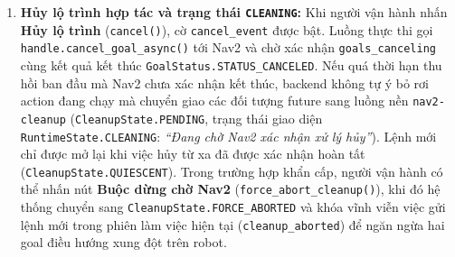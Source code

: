 \begin{enumerate}[leftmargin=1.2cm]
  \item \textbf{Hủy lộ trình hợp tác và trạng thái \texttt{CLEANING}:} Khi người vận hành nhấn \textbf{Hủy lộ trình} (\texttt{cancel()}), cờ \texttt{cancel\_event} được bật. Luồng thực thi gọi \texttt{handle.cancel\_goal\_async()} tới Nav2 và chờ xác nhận \texttt{goals\_canceling} cùng kết quả kết thúc \texttt{GoalStatus.STATUS\_CANCELED}. Nếu quá thời hạn thu hồi ban đầu mà Nav2 chưa xác nhận kết thúc, backend không tự ý bỏ rơi action đang chạy mà chuyển giao các đối tượng future sang luồng nền \texttt{nav2-cleanup} (\texttt{CleanupState.PENDING}, trạng thái giao diện \texttt{RuntimeState.CLEANING}: \textit{``Đang chờ Nav2 xác nhận xử lý hủy''}). Lệnh mới chỉ được mở lại khi việc hủy từ xa đã được xác nhận hoàn tất (\texttt{CleanupState.QUIESCENT}). Trong trường hợp khẩn cấp, người vận hành có thể nhấn nút \textbf{Buộc dừng chờ Nav2} (\texttt{force\_abort\_cleanup()}), khi đó hệ thống chuyển sang \texttt{CleanupState.FORCE\_ABORTED} và khóa vĩnh viễn việc gửi lệnh mới trong phiên làm việc hiện tại (\texttt{cleanup\_aborted}) để ngăn ngừa hai goal điều hướng xung đột trên robot.
\end{enumerate}

